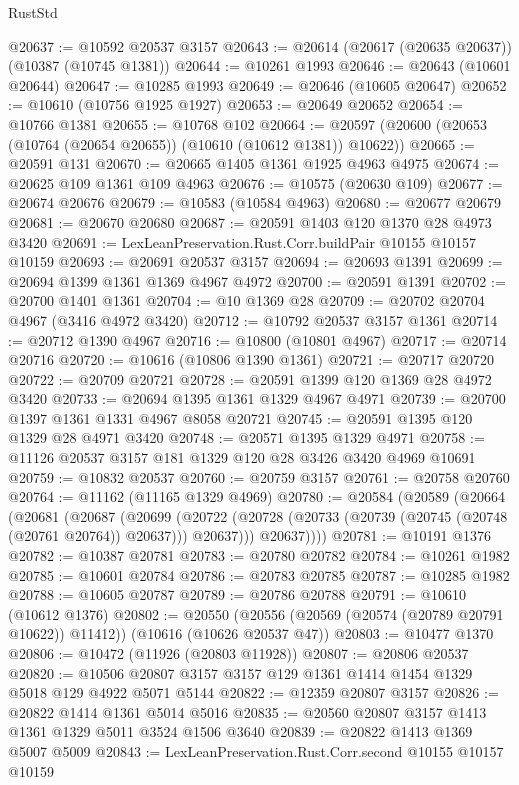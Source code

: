 \begin{lexlean}{RustStd}
\begin{coremodule}
@20637 := @10592 @20537 @3157
@20643 := @20614 (@20617 (@20635 @20637)) (@10387 (@10745 @1381))
@20644 := @10261 @1993
@20646 := @20643 (@10601 @20644)
@20647 := @10285 @1993
@20649 := @20646 (@10605 @20647)
@20652 := @10610 (@10756 @1925 @1927)
@20653 := @20649 @20652
@20654 := @10766 @1381
@20655 := @10768 @102
@20664 := @20597 (@20600 (@20653 (@10764 (@20654 @20655)) (@10610 (@10612 @1381)) @10622))
@20665 := @20591 @131
@20670 := @20665 @1405 @1361 @1925 @4963 @4975
@20674 := @20625 @109 @1361 @109 @4963
@20676 := @10575 (@20630 @109)
@20677 := @20674 @20676
@20679 := @10583 (@10584 @4963)
@20680 := @20677 @20679
@20681 := @20670 @20680
@20687 := @20591 @1403 @120 @1370 @28 @4973 @3420
@20691 := LexLeanPreservation.Rust.Corr.buildPair @10155 @10157 @10159
@20693 := @20691 @20537 @3157
@20694 := @20693 @1391
@20699 := @20694 @1399 @1361 @1369 @4967 @4972
@20700 := @20591 @1391
@20702 := @20700 @1401 @1361
@20704 := @10 @1369 @28
@20709 := @20702 @20704 @4967 (@3416 @4972 @3420)
@20712 := @10792 @20537 @3157 @1361
@20714 := @20712 @1390 @4967
@20716 := @10800 (@10801 @4967)
@20717 := @20714 @20716
@20720 := @10616 (@10806 @1390 @1361)
@20721 := @20717 @20720
@20722 := @20709 @20721
@20728 := @20591 @1399 @120 @1369 @28 @4972 @3420
@20733 := @20694 @1395 @1361 @1329 @4967 @4971
@20739 := @20700 @1397 @1361 @1331 @4967 @8058 @20721
@20745 := @20591 @1395 @120 @1329 @28 @4971 @3420
@20748 := @20571 @1395 @1329 @4971
@20758 := @11126 @20537 @3157 @181 @1329 @120 @28 @3426 @3420 @4969 @10691
@20759 := @10832 @20537
@20760 := @20759 @3157
@20761 := @20758 @20760
@20764 := @11162 (@11165 @1329 @4969)
@20780 := @20584
    (@20589
      (@20664
        (@20681
          (@20687
            (@20699
              (@20722 (@20728 (@20733 (@20739 (@20745 (@20748 (@20761 @20764)) @20637))) @20637)))
            @20637))))
@20781 := @10191 @1376
@20782 := @10387 @20781
@20783 := @20780 @20782
@20784 := @10261 @1982
@20785 := @10601 @20784
@20786 := @20783 @20785
@20787 := @10285 @1982
@20788 := @10605 @20787
@20789 := @20786 @20788
@20791 := @10610 (@10612 @1376)
@20802 := @20550
    (@20556 (@20569 (@20574 (@20789 @20791 @10622)) @11412))
    (@10616 (@10626 @20537 @47))
@20803 := @10477 @1370
@20806 := @10472 (@11926 (@20803 @11928))
@20807 := @20806 @20537
@20820 := @10506 @20807 @3157 @3157 @129 @1361 @1414 @1454 @1329 @5018 @129 @4922 @5071 @5144
@20822 := @12359 @20807 @3157
@20826 := @20822 @1414 @1361 @5014 @5016
@20835 := @20560 @20807 @3157 @1413 @1361 @1329 @5011 @3524 @1506 @3640
@20839 := @20822 @1413 @1369 @5007 @5009
@20843 := LexLeanPreservation.Rust.Corr.second @10155 @10157 @10159

\end{coremodule}
\end{lexlean}

